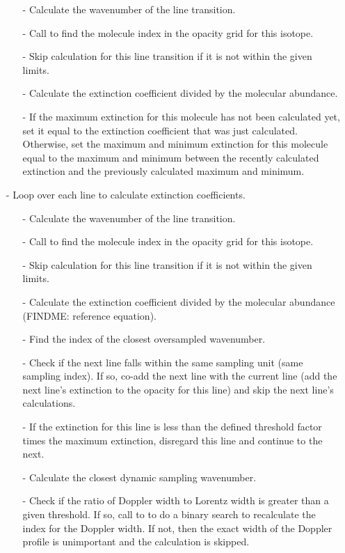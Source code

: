 \documentclass[letterpaper,12pt]{article}
\begin{document}
\begin{enumerate}[leftmargin=10pt, noitemsep, parsep=0pt, topsep=0ex]
\begin{enumerate}[leftmargin=10pt, noitemsep, parsep=0pt, topsep=0ex]
\item[-] Calculate the wavenumber of the line transition.
\item[-] Call   to find the molecule index in the opacity grid for this isotope.
\item[-] Skip calculation for this line transition if it is not within the given limits.
\item[-] Calculate the extinction coefficient divided by the molecular abundance.
\item[-] If the maximum extinction for this molecule has not been calculated yet, set it equal to the extinction coefficient that was just calculated. Otherwise, set the maximum and minimum extinction for this molecule equal to the maximum and minimum between the recently calculated extinction and the previously calculated maximum and minimum.
\end{enumerate}
\item[-] Loop over each line to calculate extinction coefficients.
\begin{enumerate}[leftmargin=10pt, noitemsep, parsep=0pt, topsep=0ex]
\item[-] Calculate the wavenumber of the line transition.
\item[-] Call  to find the molecule index in the opacity grid for this isotope.
\item[-] Skip calculation for this line transition if it is not within the given limits.
\item[-] Calculate the extinction coefficient divided by the molecular abundance (FINDME: reference equation).
\item[-] Find the index of the closest oversampled wavenumber.
\item[-] Check if the next line falls within the same sampling unit (same sampling index). If so, co-add the next line with the current line (add the next line's extinction to the opacity for this line) and skip the next line's calculations.
\item[-] If the extinction for this line is less than the defined threshold factor times the maximum extinction, disregard this line and continue to the next.
\item[-] Calculate the closest dynamic sampling wavenumber.
\item[-] Check if the ratio of Doppler width to Lorentz width is greater than a given threshold. If so, call to  to do a binary search to recalculate the index for the Doppler width. If not, then the exact width of the Doppler profile is unimportant and the calculation is skipped.

\end{enumerate}
\end{enumerate}
\end{document}
